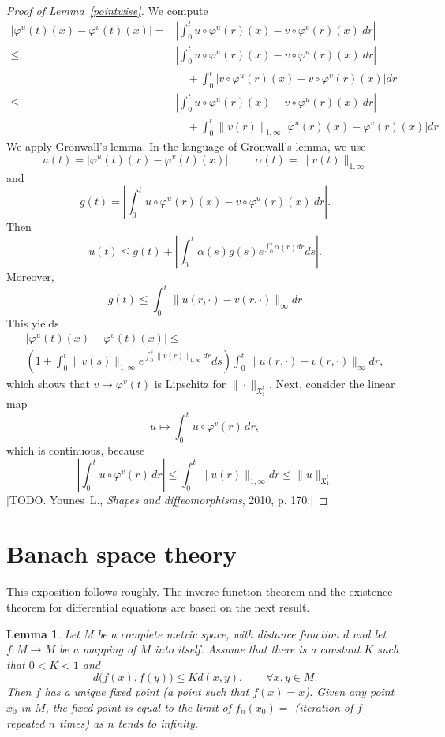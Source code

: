 \documentclass[a5paper,10pt,twoside]{article}
\newcommand{\X}{\ensuremath{\mathfrak{X}}}
\theoremstyle{plain}
\newtheorem{lem}[teo]{Lemma}
\theoremstyle{definition}
\theoremstyle{remark}
\begin{document}
\begin{proof}[Proof of Lemma~\ref{pointwise}]
	We compute
	\begin{align*}
	\left|\varphi^u(t)(x)-\varphi^v(t)(x)\right| =& \left|\int_0^t u\circ \varphi^u(r)(x)-v\circ \varphi^v(r)(x)\ dr\right|\\
	\leq & \left|\int_0^t u\circ \varphi^u(r)(x)-v\circ \varphi^u(r)(x)\ dr\right|\\
	&\quad +\int_0^t \left|v\circ \varphi^u(r)(x)-v\circ \varphi^v(r)(x)\right| dr\\
	\leq & \left|\int_0^t u\circ \varphi^u(r)(x)-v\circ \varphi^u(r)(x)\ dr\right|\\
	&\quad +\int_0^t\|v(r)\|_{1,\infty} \left|\varphi^u(r)(x)-\varphi^v(r)(x)\right| dr
	\end{align*}
	We apply Grönwall's lemma. In the language of Grönwall's lemma, we use
	\[
	u(t)=\left|\varphi^u(t)(x)-\varphi^v(t)(x)\right|,\qquad \alpha(t)=\|v(t)\|_{1,\infty}
	\]
	and
	\[
	g(t)=\left|\int_0^t u\circ \varphi^u(r)(x)-v\circ \varphi^u(r)(x)\ dr\right|.
	\]
	Then
	\[
	u(t)\leq g(t)+\left|\int_0^t \alpha(s) g(s) e^{\int_0^s\alpha(r)dr}ds\right|.
	\]
	Moreover,
	\[
	g(t)\leq \int_0^t\|u(r,\cdot)-v(r,\cdot)\|_\infty dr
	\]
	This yields
	\begin{multline*}
	\left|\varphi^u(t)(x)-\varphi^v(t)(x)\right|\leq\\
	\left(1+\int_0^t \|v(s)\|_{1,\infty}e^{\int_0^s\|v(r)\|_{1,\infty}dr}ds\right)\int_0^t\|u(r,\cdot)-v(r,\cdot)\|_\infty dr,
	\end{multline*}
	which shows that $v\mapsto\varphi^v(t)$ is Lipschitz for $\|\cdot\|_{\X_1^t}$. Next, consider the linear map
	\[
	u\mapsto \int_0^t u\circ \varphi^v(r)\,dr,
	\]
	which is continuous, because
	\[
	\left|\int_0^t u\circ \varphi^v(r)\,dr\right|\leq \int_0^t\|u(r)\|_{1,\infty}dr\leq \|u\|_{\X_1^t}
	\]
	[TODO. Younes~L., \textit{Shapes and diffeomorphisms}, 2010, p. 170.]
\end{proof}

\section{Banach space theory \label{app:Banach}}
This exposition follows \cite{lang1999} roughly. The inverse function theorem and the existence theorem for differential equations are based on the next result.

\begin{lem}
	Let M be a complete metric space, with distance function $d$ and let $f:M\to M$ be a mapping of $M$ into itself. Assume that there is a constant $K$ such that $0<K<1$ and
	\[
	d\big(f(x),f(y)\big)\leq K d(x,y),\qquad\forall x,y\in M.
	\]
	Then $f$ has a unique fixed point (a point such that $f(x) = x$). Given any
	point $x_0$ in $M$, the fixed point is equal to the limit of $f_n(x_0)=$ (iteration of $f$ repeated $n$ times) as $n$ tends to infinity.
\end{lem}
\end{document}
